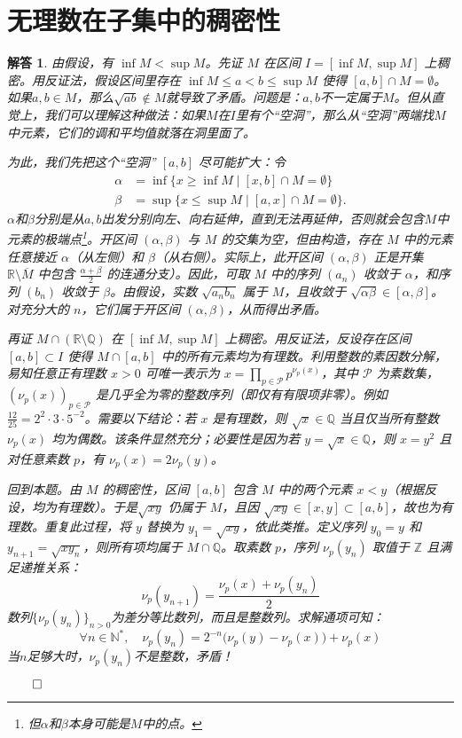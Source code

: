 \documentclass[12pt,UTF8]{ctexbook}
\theoremstyle{exercisestyle}
\theoremstyle{solutionstyle}
\newtheorem*{solution*}{解答}
\newenvironment{solution}
  {\begin{solution*}}
  {\hfill\ensuremath{\qed}\end{solution*}}
\begin{document}
\section{无理数在子集中的稠密性}
\begin{solution}
  由假设，有 \( \inf M < \sup M \)。先证 \( M \) 在区间 \( I = [\inf M, \sup M] \) 上稠密。用反证法，假设区间里存在 \( \inf M \leqslant a < b \leqslant \sup M \) 使得 \( [a, b] \cap M = \emptyset \)。如果$a,b\in M$，那么$\sqrt{ab}\notin M$就导致了矛盾。问题是：$a,b$不一定属于$M$。但从直觉上，我们可以理解这种做法：如果$M$在$I$里有个“空洞”，那么从“空洞”两端找$M$中元素，它们的调和平均值就落在洞里面了。
  
  为此，我们先把这个“空洞” \( [a, b] \) 尽可能扩大：令
  \begin{align*}
  \alpha &= \inf \{ x \geqslant \inf M \mid [x, b] \cap M = \emptyset \} \\
  \beta &= \sup \{ x \leqslant \sup M \mid [a, x] \cap M = \emptyset \}.
  \end{align*}
  $\alpha$和$\beta$分别是从$a, b$出发分别向左、向右延伸，直到无法再延伸，否则就会包含$M$中元素的极端点\footnote{但$\alpha$和$\beta$本身可能是$M$中的点。}。开区间 \( (\alpha, \beta) \) 与 \( M \) 的交集为空，但由构造，存在 \( M \) 中的元素任意接近 \( \alpha \)（从左侧）和 \( \beta \)（从右侧）。实际上，此开区间 \( (\alpha, \beta) \) 正是开集 \( \mathbb{R} \setminus \overline{M} \) 中包含 \( \frac{\alpha + \beta}{2} \) 的连通分支）。因此，可取 \( M \) 中的序列 \( (a_n) \) 收敛于 \( \alpha \)，和序列 \( (b_n) \) 收敛于 \( \beta \)。由假设，实数 \( \sqrt{a_n b_n} \) 属于 \( M \)，且收敛于 \( \sqrt{\alpha \beta} \in [\alpha, \beta] \)。对充分大的 \( n \)，它们属于开区间 \( (\alpha, \beta) \)，从而得出矛盾。

  再证 \( M \cap (\mathbb{R} \setminus \mathbb{Q}) \) 在 \( [\inf M, \sup M] \) 上稠密。用反证法，反设存在区间 \( [a, b] \subset I \) 使得 \( M \cap [a, b] \) 中的所有元素均为有理数。利用整数的素因数分解，易知任意正有理数 \( x > 0 \) 可唯一表示为 \( x = \prod_{p \in \mathcal{P}} p^{\nu_p(x)} \)，其中 \( \mathcal{P} \) 为素数集，\( (\nu_p(x))_{p \in \mathcal{P}} \) 是几乎全为零的整数序列（即仅有有限项非零）。例如 \( \frac{12}{25} = 2^2 \cdot 3 \cdot 5^{-2} \)。需要以下结论：若 \( x \) 是有理数，则 \( \sqrt{x} \in \mathbb{Q} \) 当且仅当所有整数 \( \nu_p(x) \) 均为偶数。该条件显然充分；必要性是因为若 \( y = \sqrt{x} \in \mathbb{Q} \)，则 \( x = y^2 \) 且对任意素数 \( p \)，有 \( \nu_p(x) = 2\nu_p(y) \)。

  回到本题。由 \( M \) 的稠密性，区间 \( [a, b] \) 包含 \( M \) 中的两个元素 \( x < y \)（根据反设，均为有理数）。于是\( \sqrt{xy} \) 仍属于 \( M \)，且因 \( \sqrt{xy} \in [x, y] \subset [a, b] \)，故也为有理数。重复此过程，将 \( y \) 替换为 \( y_1 = \sqrt{xy} \)，依此类推。定义序列 \( y_0 = y \) 和 \( y_{n+1} = \sqrt{x y_n} \)，则所有项均属于 \( M \cap \mathbb{Q} \)。取素数 \( p \)，序列 \( \nu_p(y_n) \) 取值于 \( \mathbb{Z} \) 且满足递推关系：
  \[ \nu_p(y_{n+1}) = \frac{\nu_p(x) + \nu_p(y_n)}{2} \]
  数列$\{\nu_p(y_n)\}_{n>0}$为差分等比数列，而且是整数列。求解通项可知：
  \[\forall n\in \mathbb{N}^*, \quad \nu_p(y_n) = 2^{-n}\big(\nu_p(y) - \nu_p(x)\big) + \nu_p(x) \]
  当$n$足够大时，$\nu_p(y_n)$不是整数，矛盾！


\end{solution}
\end{document}

